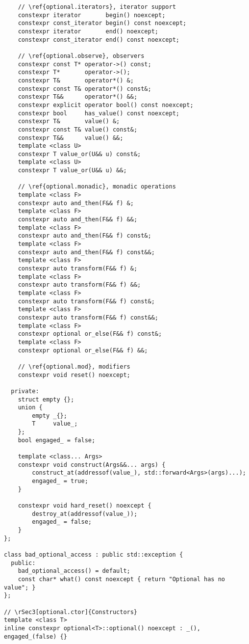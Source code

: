\documentclass[a4paper,10pt,oneside,openany,final,article]{memoir}
\begin{document}
\begin{verbatim}
    // \ref{optional.iterators}, iterator support
    constexpr iterator       begin() noexcept;
    constexpr const_iterator begin() const noexcept;
    constexpr iterator       end() noexcept;
    constexpr const_iterator end() const noexcept;

    // \ref{optional.observe}, observers
    constexpr const T* operator->() const;
    constexpr T*       operator->();
    constexpr T&       operator*() &;
    constexpr const T& operator*() const&;
    constexpr T&&      operator*() &&;
    constexpr explicit operator bool() const noexcept;
    constexpr bool     has_value() const noexcept;
    constexpr T&       value() &;
    constexpr const T& value() const&;
    constexpr T&&      value() &&;
    template <class U>
    constexpr T value_or(U&& u) const&;
    template <class U>
    constexpr T value_or(U&& u) &&;

    // \ref{optional.monadic}, monadic operations
    template <class F>
    constexpr auto and_then(F&& f) &;
    template <class F>
    constexpr auto and_then(F&& f) &&;
    template <class F>
    constexpr auto and_then(F&& f) const&;
    template <class F>
    constexpr auto and_then(F&& f) const&&;
    template <class F>
    constexpr auto transform(F&& f) &;
    template <class F>
    constexpr auto transform(F&& f) &&;
    template <class F>
    constexpr auto transform(F&& f) const&;
    template <class F>
    constexpr auto transform(F&& f) const&&;
    template <class F>
    constexpr optional or_else(F&& f) const&;
    template <class F>
    constexpr optional or_else(F&& f) &&;

    // \ref{optional.mod}, modifiers
    constexpr void reset() noexcept;

  private:
    struct empty {};
    union {
        empty _{};
        T     value_;
    };
    bool engaged_ = false;

    template <class... Args>
    constexpr void construct(Args&&... args) {
        construct_at(addressof(value_), std::forward<Args>(args)...);
        engaged_ = true;
    }

    constexpr void hard_reset() noexcept {
        destroy_at(addressof(value_));
        engaged_ = false;
    }
};

class bad_optional_access : public std::exception {
  public:
    bad_optional_access() = default;
    const char* what() const noexcept { return "Optional has no value"; }
};

// \rSec3[optional.ctor]{Constructors}
template <class T>
inline constexpr optional<T>::optional() noexcept : _(), engaged_(false) {}


\end{verbatim}
\end{document}
